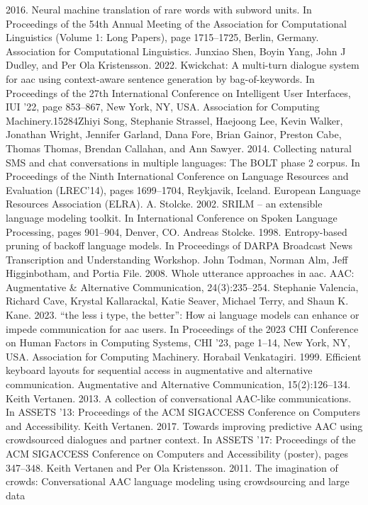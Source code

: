 2016. Neural machine translation of rare words with
subword units. In Proceedings of the 54th Annual
Meeting of the Association for Computational Linguistics (Volume 1: Long Papers), page 1715–1725,
Berlin, Germany. Association for Computational Linguistics.
Junxiao Shen, Boyin Yang, John J Dudley, and Per Ola
Kristensson. 2022. Kwickchat: A multi-turn dialogue system for aac using context-aware sentence
generation by bag-of-keywords. In Proceedings of
the 27th International Conference on Intelligent User
Interfaces, IUI ’22, page 853–867, New York, NY,
USA. Association for Computing Machinery.15284Zhiyi Song, Stephanie Strassel, Haejoong Lee, Kevin
Walker, Jonathan Wright, Jennifer Garland, Dana
Fore, Brian Gainor, Preston Cabe, Thomas Thomas,
Brendan Callahan, and Ann Sawyer. 2014. Collecting natural SMS and chat conversations in multiple
languages: The BOLT phase 2 corpus. In Proceedings of the Ninth International Conference on Language Resources and Evaluation (LREC’14), pages
1699–1704, Reykjavik, Iceland. European Language
Resources Association (ELRA).
A. Stolcke. 2002. SRILM – an extensible language modeling toolkit. In International Conference on Spoken
Language Processing, pages 901–904, Denver, CO.
Andreas Stolcke. 1998. Entropy-based pruning of backoff language models. In Proceedings of DARPA
Broadcast News Transcription and Understanding
Workshop.
John Todman, Norman Alm, Jeff Higginbotham, and
Portia File. 2008. Whole utterance approaches in aac.
AAC: Augmentative & Alternative Communication,
24(3):235–254.
Stephanie Valencia, Richard Cave, Krystal Kallarackal,
Katie Seaver, Michael Terry, and Shaun K. Kane.
2023. “the less i type, the better”: How ai language
models can enhance or impede communication for
aac users. In Proceedings of the 2023 CHI Conference on Human Factors in Computing Systems, CHI
’23, page 1–14, New York, NY, USA. Association for
Computing Machinery.
Horabail Venkatagiri. 1999. Efficient keyboard layouts
for sequential access in augmentative and alternative communication. Augmentative and Alternative
Communication, 15(2):126–134.
Keith Vertanen. 2013. A collection of conversational
AAC-like communications. In ASSETS ’13: Proceedings of the ACM SIGACCESS Conference on
Computers and Accessibility.
Keith Vertanen. 2017. Towards improving predictive
AAC using crowdsourced dialogues and partner context. In ASSETS ’17: Proceedings of the ACM
SIGACCESS Conference on Computers and Accessibility (poster), pages 347–348.
Keith Vertanen and Per Ola Kristensson. 2011. The
imagination of crowds: Conversational AAC language modeling using crowdsourcing and large data

